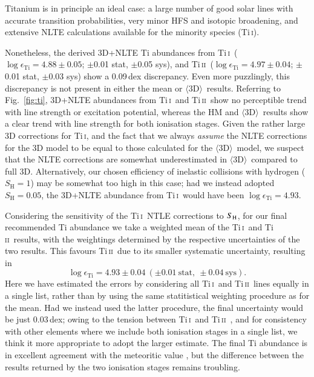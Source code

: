 \documentclass[traditabstract]{aa}
\newcommand{\oneDAV}{$\langle\mathrm{3D}\rangle$}
\newcommand{\alttii}{Ti\,\textsc{i}}
\newcommand{\alttiii}{Ti\,\textsc{ii}}
\newcommand{\tii}{\alttii\ }
\newcommand{\tiii}{\alttiii\ }
\begin{document}
Titanium is in principle an ideal case: a large number of good solar lines with accurate transition probabilities, very minor HFS and isotopic broadening, and extensive NLTE calculations available for the minority species (\alttii).  

Nonetheless, the derived 3D+NLTE Ti abundances from \tii ($\log \epsilon_\mathrm{Ti}=4.88\pm0.05$; $\pm$0.01 stat, $\pm$0.05 sys), and \tiii ($\log \epsilon_\mathrm{Ti}=4.97\pm0.04$; $\pm$0.01 stat, $\pm$0.03 sys) show a 0.09\,dex discrepancy. Even more puzzlingly, this discrepancy is not present in either the mean  or \oneDAV\ results.  Referring to Fig.~\ref{fig:ti}, 3D+NLTE abundances from \tii and \tiii show no perceptible trend with line strength or excitation potential, whereas the HM and \oneDAV\ results show a clear trend with line strength for both ionisation stages.  Given the rather large 3D corrections for \alttii, and the fact that we always \textit{assume} the NLTE corrections for the 3D model to be equal to those calculated for the \oneDAV\ model, we suspect that the NLTE corrections are somewhat underestimated in \oneDAV\ compared to full 3D.  Alternatively, our chosen efficiency of inelastic collisions with hydrogen ($S_\mathrm{H}=1$) may be somewhat too high in this case; had we instead adopted $S_\mathrm{H}=0.05$, the 3D+NLTE abundance from \tii would have been $\log \epsilon_\mathrm{Ti}=4.93$.

Considering the sensitivity of the \tii NTLE corrections to $S_{\rm H}$, for our final recommended Ti abundance we take a weighted mean of the \tii and \tiii results, with the weightings determined by the respective uncertainties of the two results.  This favours \tiii due to its smaller systematic uncertainty, resulting in
\begin{displaymath}
\log \epsilon_\mathrm{Ti}=4.93\pm0.04\ (\pm0.01\ \mathrm{stat},\ \pm0.04\ \mathrm{sys}).
\end{displaymath}
Here we have estimated the errors by considering all \tii and \tiii lines equally in a single list, rather than by using the same statitistical weighting procedure as for the mean.  Had we instead used the latter procedure, the final uncertainty would be just $0.03$\,dex; owing to the tension between \tii and \tiii, and for consistency with other elements where we include both ionisation stages in a single list, we think it more appropriate to adopt the larger estimate.  The final Ti abundance is in excellent agreement with the meteoritic value \citep[$4.91\pm0.03$;][]{Lodders09}, but the difference between the results returned by the two ionisation stages remains troubling.  
\end{document}
